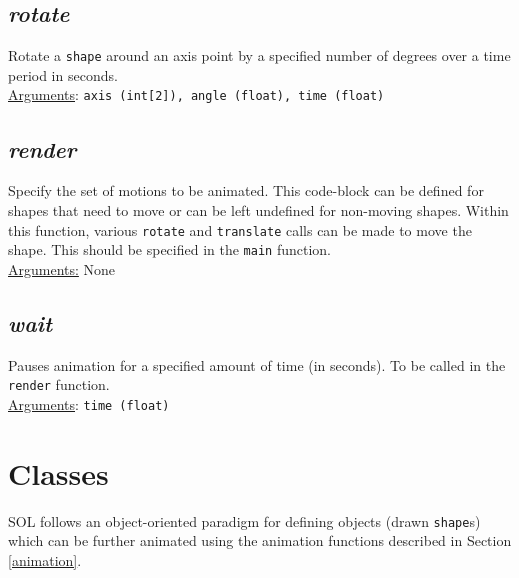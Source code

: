 \documentclass[letterpaper,12pt]{article}
\begin{document}
\subsection{\textit{rotate}}
Rotate a \texttt{shape} around an axis point by a specified number of degrees over a time period in seconds.\\
\underline{Arguments}: \texttt{axis (int[2]), angle (float), time (float)}

\subsection{\textit{render}}
Specify the set of motions to be animated. This code-block can be defined for shapes that need to move or can be left undefined for non-moving shapes. Within this function, various \texttt{rotate} and \texttt{translate} calls can be made to move the shape. This should be specified in the \texttt{main} function.\\
\underline{Arguments:} None

\subsection{\textit{wait}}
Pauses animation for a specified amount of time (in seconds). To be called in the \texttt{render} function.\\
\underline{Arguments}: \texttt{time (float)}


\section{Classes}
SOL follows an object-oriented paradigm for defining objects (drawn \texttt{shape}s) which can be further animated using the animation functions described in Section \ref{animation}.
\end{document}
